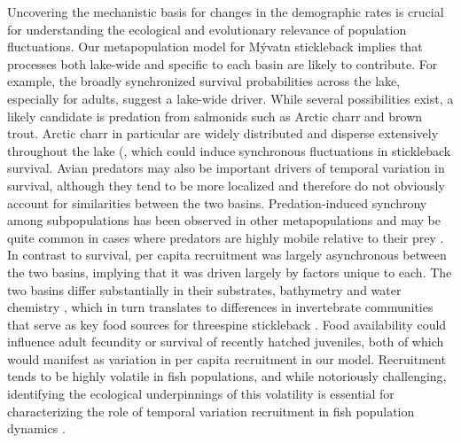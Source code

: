 \documentclass[11pt]{article}
\begin{document}
Uncovering the mechanistic basis for changes in the demographic rates 
is crucial for understanding the ecological and evolutionary relevance 
of population fluctuations. 
Our metapopulation model for M\'{y}vatn stickleback implies that processes both lake-wide 
and specific to each basin are likely to contribute. 
For example, the broadly synchronized survival probabilities across the lake, 
especially for adults, suggest a lake-wide driver. 
While several possibilities exist, 
a likely candidate is predation from salmonids such as Arctic charr and brown trout. 
Arctic charr in particular are widely distributed and disperse extensively 
throughout the lake (\citep[REF;][]{gudbergsson2004}, 
which could induce synchronous fluctuations in stickleback survival. 
Avian predators may also be important drivers of temporal variation in survival, 
although they tend to be more localized \citep{einarsson2004myvatn}
and therefore do not obviously account for similarities between the two basins. 
Predation-induced synchrony among subpopulations has been observed in other metapopulations 
and may be quite common in cases where predators are highly mobile relative to their prey 
\citep{ims2000, gilg2009}. 
In contrast to survival, 
per capita recruitment was largely asynchronous between the two basins, 
implying that it was driven largely by factors unique to each. 
The two basins differ substantially in their substrates, bathymetry and water chemistry 
\citep{einarsson2004myvatn}, 
which in turn translates to differences 
in invertebrate communities \citep{bartrons2015spatial} 
that serve as key food sources for threespine stickleback \citep{gudmundsson1996}. 
Food availability could influence adult fecundity or survival 
of recently hatched juveniles, 
both of which would manifest as variation in per capita recruitment in our model. 
Recruitment tends to be highly volatile in fish populations, 
and while notoriously challenging, 
identifying the ecological underpinnings of this volatility is essential 
for characterizing the role 
of temporal variation recruitment in fish population dynamics 
\citep{dixon1999episodic, ludsin2014physical}.
\end{document}
